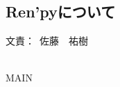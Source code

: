 \documentclass[a4paper]{jarticle}
\newcommand{\resp}[1]{\begin{flushright}文責：~#1\end{flushright}~\\}
\begin{document}
\fi

\subsection{Ren'pyについて}
  \resp{佐藤　祐樹}


\expandafter\ifx\csname MAIN \endcsname\relax
  
\end{document}
